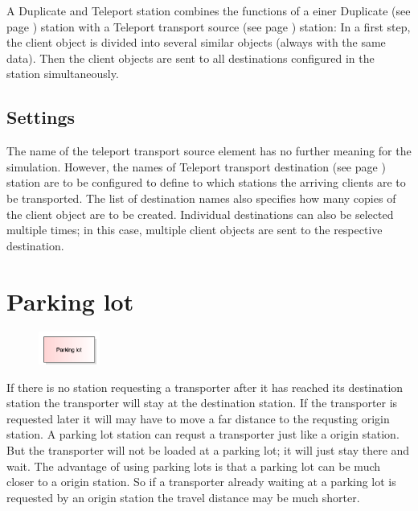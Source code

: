 A Duplicate and Teleport station combines the functions of a
einer Duplicate (see page \pageref{ref:ModelElementDuplicate}) station with a
Teleport transport source (see page \pageref{ref:ModelElementTeleportSource}) station:
In a first step, the client object is divided into several similar objects
(always with the same data). Then the client objects are sent to all destinations
configured in the station simultaneously.

\subsection*{Settings}

The name of the teleport transport source element has no further meaning for the simulation.
However, the names of Teleport transport destination (see page \pageref{ref:ModelElementTeleportDestination}) 
station are to be configured to define to which stations the arriving clients are to be transported.
The list of destination names also specifies how many copies of the client object are to be created.
Individual destinations can also be selected multiple times; in this case, multiple client objects
are sent to the respective destination.


\section{Parking lot}
\label{ref:ModelElementTransportParking}

\begin{figure}
\vspace{-22pt}
\includegraphics[width=2cm]{imageModelElementTransportParking.png}
\vspace{-22pt}
\end{figure}

If there is no station requesting a transporter after it has reached its
destination station the transporter will stay at the destination station. 
If the transporter is requested later it will may have to move a far distance
to the requsting origin station. A parking lot station can requst a transporter
just like a origin station. But the transporter will not be loaded at a parking lot;
it will just stay there and wait. The advantage of using parking lots is that
a parking lot can be much closer to a origin station. So if a transporter
already waiting at a parking lot is requested by an origin station the
travel distance may be much shorter.

